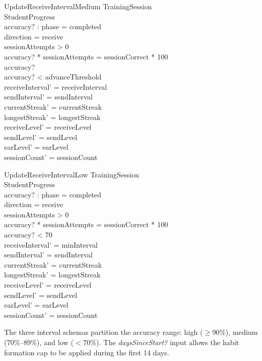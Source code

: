 \documentclass[a4paper,10pt,fleqn]{article}
\begin{document}
\begin{schema}{UpdateReceiveIntervalMedium}
\Xi TrainingSession \\
\Delta StudentProgress \\
accuracy? : \nat
\where
phase = completed \\
direction = receive \\
sessionAttempts > 0 \\
accuracy? * sessionAttempts = sessionCorrect * 100 \\
accuracy?  \\
accuracy? < advanceThreshold \\
receiveInterval' = receiveInterval \\
sendInterval' = sendInterval \\
currentStreak' = currentStreak \\
longestStreak' = longestStreak \\
receiveLevel' = receiveLevel \\
sendLevel' = sendLevel \\
earLevel' = earLevel \\
sessionCount' = sessionCount
\end{schema}

\begin{schema}{UpdateReceiveIntervalLow}
\Xi TrainingSession \\
\Delta StudentProgress \\
accuracy? : \nat
\where
phase = completed \\
direction = receive \\
sessionAttempts > 0 \\
accuracy? * sessionAttempts = sessionCorrect * 100 \\
accuracy? < 70 \\
receiveInterval' = minInterval \\
sendInterval' = sendInterval \\
currentStreak' = currentStreak \\
longestStreak' = longestStreak \\
receiveLevel' = receiveLevel \\
sendLevel' = sendLevel \\
earLevel' = earLevel \\
sessionCount' = sessionCount
\end{schema}

The three interval schemas partition the accuracy range: high ($\geq 90\%$),
medium ($70\%$--$89\%$), and low ($< 70\%$). The \emph{daysSinceStart?} input
allows the habit formation cap to be applied during the first 14 days.
\end{document}
